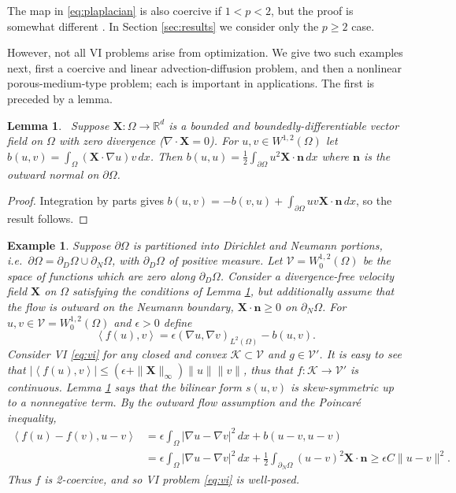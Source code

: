 \documentclass[letterpaper,final,12pt,reqno]{amsart}
\theoremstyle{cstyle}
\newtheorem{lemma}[theorem]{Lemma}
\theoremstyle{cstyle*}
\theoremstyle{dstyle}
\newtheorem{example}[theorem]{Example}
\numberwithin{equation}{section}
\numberwithin{figure}{section}
\numberwithin{table}{section}
\numberwithin{theorem}{section}
\newcommand{\eps}{\epsilon}
\newcommand{\RR}{\mathbb{R}}
\newcommand{\grad}{\nabla}
\newcommand{\Div}{\nabla\cdot}
\newcommand{\bn}{\mathbf{n}}
\newcommand{\bX}{\mathbf{X}}
\newcommand{\cK}{\mathcal{K}}
\newcommand{\cV}{\mathcal{V}}
\newcommand{\ip}[2]{\left<#1,#2\right>}
\begin{document}
The map in \eqref{eq:plaplacian} is also coercive if $1<p<2$, but the proof is somewhat different \cite[Theorem 4.4]{Bueler2021conservation}.  In Section \ref{sec:results} we consider only the $p\ge 2$ case.

However, not all VI problems arise from optimization.  We give two such examples next, first a coercive and linear advection-diffusion problem, and then a nonlinear porous-medium-type problem; each is important in applications.  The first is preceded by a lemma.

\begin{lemma}  \label{lem:advectionskew}  \cite{Elmanetal2014}\,  Suppose $\bX :\Omega \to \RR^d$ is a bounded and boundedly-differentiable vector field on $\Omega$ with zero divergence ($\Div \bX=0$).  For $u,v \in W^{1,2}(\Omega)$ let $b(u,v) = \int_\Omega (\bX \cdot \grad u) v\,dx$.  Then $b(u,u) = \frac{1}{2} \int_{\partial \Omega} u^2 \bX\cdot \bn\,dx$ where $\bn$ is the outward normal on $\partial \Omega$.
\end{lemma}

\begin{proof}
Integration by parts gives $b(u,v) = - b(v,u) + \int_{\partial \Omega} uv \bX\cdot \bn\,dx$, so the result follows.
\end{proof}

\begin{example}  \label{ex:advectiondiffusion}  Suppose $\partial\Omega$ is partitioned into Dirichlet and Neumann portions, i.e.~$\partial\Omega = \partial_D\Omega \cup \partial_N\Omega$, with $\partial_D\Omega$ of positive measure.  Let $\cV = W_0^{1,2}(\Omega)$ be the space of functions which are zero along $\partial_D\Omega$.  Consider a divergence-free velocity field $\bX$ on $\Omega$ satisfying the conditions of Lemma \ref{lem:advectionskew}, but additionally assume that the flow is outward on the Neumann boundary, $\bX \cdot \bn \ge 0$ on $\partial_N\Omega$.  For $u,v \in \cV = W_0^{1,2}(\Omega)$ and $\eps>0$ define
\begin{equation}
\ip{f(u)}{v} = \eps \left(\grad u, \grad v\right)_{L^2(\Omega)} - b(u,v). \label{eq:advectiondiffusion}
\end{equation}
Consider VI \eqref{eq:vi} for any closed and convex $\cK \subset \cV$ and $g\in\cV'$.  It is easy to see that $|\ip{f(u)}{v}| \le (\eps + \|\bX\|_\infty) \|u\| \|v\|$, thus that $f:\cK \to \cV'$ is continuous.  Lemma \ref{lem:advectionskew} says that the bilinear form $s(u,v)$ is skew-symmetric up to a nonnegative term.  By the outward flow assumption and the Poincar\'e inequality,
\begin{align*}
\ip{f(u)-f(v)}{u-v} &= \eps \int_\Omega |\grad u - \grad v|^2\,dx + b(u-v,u-v) \\
                    &= \eps \int_\Omega |\grad u - \grad v|^2\,dx + \frac{1}{2} \int_{\partial_N\Omega} (u-v)^2 \bX\cdot\bn \ge \eps C \|u-v\|^2.
\end{align*}
Thus $f$ is 2-coercive, and so VI problem \eqref{eq:vi} is well-posed.
\end{example}
\end{document}
